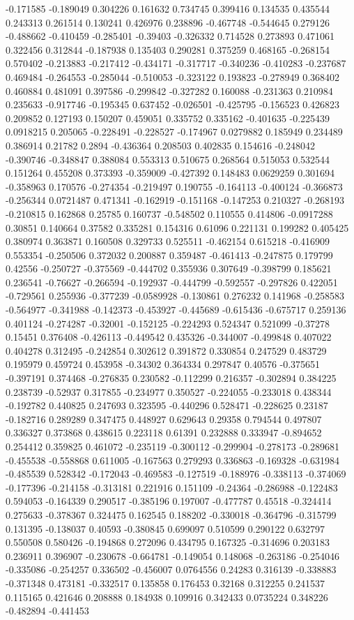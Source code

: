 -0.171585 -0.189049 0.304226 0.161632 0.734745 0.399416 0.134535 0.435544 0.243313 0.261514 0.130241 0.426976 0.238896 -0.467748 -0.544645 0.279126 -0.488662 -0.410459 -0.285401 -0.39403 -0.326332 0.714528 0.273893 0.471061 0.322456 0.312844 -0.187938 0.135403 0.290281 0.375259 0.468165 -0.268154 0.570402 -0.213883 -0.217412 -0.434171 -0.317717 -0.340236 -0.410283 -0.237687 0.469484 -0.264553 -0.285044 -0.510053 -0.323122 0.193823 -0.278949 0.368402 0.460884 0.481091 0.397586 -0.299842 -0.327282 0.160088 -0.231363 0.210984 0.235633 -0.917746 -0.195345 0.637452 -0.026501 -0.425795 -0.156523 0.426823 0.209852 0.127193 0.150207 0.459051 0.335752 0.335162 -0.401635 -0.225439 0.0918215 0.205065 -0.228491 -0.228527 -0.174967 0.0279882 0.185949 0.234489 0.386914 0.21782 0.2894 -0.436364 0.208503 0.402835 0.154616 -0.248042 -0.390746 -0.348847 0.388084 0.553313 0.510675 0.268564 0.515053 0.532544 0.151264 0.455208 0.373393 -0.359009 -0.427392 0.148483 0.0629259 0.301694 -0.358963 0.170576 -0.274354 -0.219497 0.190755 -0.164113 -0.400124 -0.366873 -0.256344 0.0721487 0.471341 -0.162919 -0.151168 -0.147253 0.210327 -0.268193 -0.210815 0.162868 0.25785 0.160737 -0.548502 0.110555 0.414806 -0.0917288 0.30851 0.140664 0.37582 0.335281 0.154316 0.61096 0.221131 0.199282 0.405425 0.380974 0.363871 0.160508 0.329733 0.525511 -0.462154 0.615218 -0.416909 0.553354 -0.250506 0.372032 0.200887 0.359487 -0.461413 -0.247875 0.179799 0.42556 -0.250727 -0.375569 -0.444702 0.355936 0.307649 -0.398799 0.185621 0.236541 -0.76627 -0.266594 -0.192937 -0.444799 -0.592557 -0.297826 0.422051 -0.729561 0.255936 -0.377239 -0.0589928 -0.130861 0.276232 0.141968 -0.258583 -0.564977 -0.341988 -0.142373 -0.453927 -0.445689 -0.615436 -0.675717 0.259136 0.401124 -0.274287 -0.32001 -0.152125 -0.224293 0.524347 0.521099 -0.37278 0.15451 0.376408 -0.426113 -0.449542 0.435326 -0.344007 -0.499848 0.407022 0.404278 0.312495 -0.242854 0.302612 0.391872 0.330854 0.247529 0.483729 0.195979 0.459724 0.453958 -0.34302 0.364334 0.297847 0.40576 -0.375651 -0.397191 0.374468 -0.276835 0.230582 -0.112299 0.216357 -0.302894 0.384225 0.238739 -0.52937 0.317855 -0.234977 0.350527 -0.224055 -0.233018 0.438344 -0.192782 0.440825 0.247693 0.323595 -0.440296 0.528471 -0.228625 0.23187 -0.182716 0.289289 0.347475 0.448927 0.629643 0.29358 0.794544 0.497807 0.336327 0.373868 0.438615 0.223118 0.61391 0.232888 0.333947 -0.894652 0.254412 0.359825 0.461072 -0.235119 -0.300112 -0.299904 -0.278173 -0.289681 -0.455538 -0.558868 0.611005 -0.167563 0.279293 0.336863 -0.169328 -0.631984 -0.485539 0.528342 -0.172043 -0.469583 -0.127519 -0.188976 -0.338113 -0.374069 -0.177396 -0.214158 -0.313181 0.221916 0.151109 -0.24364 -0.286988 -0.122483 0.594053 -0.164339 0.290517 -0.385196 0.197007 -0.477787 0.45518 -0.324414 0.275633 -0.378367 0.324475 0.162545 0.188202 -0.330018 -0.364796 -0.315799 0.131395 -0.138037 0.40593 -0.380845 0.699097 0.510599 0.290122 0.632797 0.550508 0.580426 -0.194868 0.272096 0.434795 0.167325 -0.314696 0.203183 0.236911 0.396907 -0.230678 -0.664781 -0.149054 0.148068 -0.263186 -0.254046 -0.335086 -0.254257 0.336502 -0.456007 0.0764556 0.24283 0.316139 -0.338883 -0.371348 0.473181 -0.332517 0.135858 0.176453 0.32168 0.312255 0.241537 0.115165 0.421646 0.208888 0.184938 0.109916 0.342433 0.0735224 0.348226 -0.482894 -0.441453 